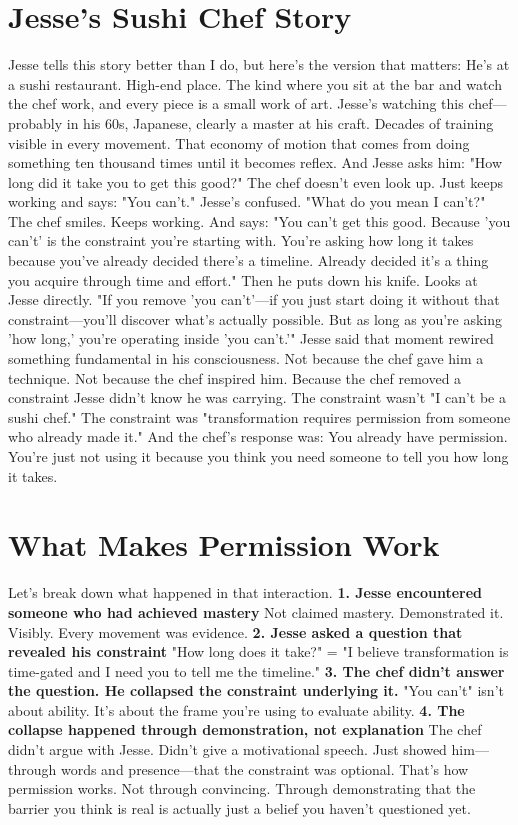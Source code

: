 \documentclass[12pt,openany]{book}
\begin{document}
\section{Jesse's Sushi Chef Story}

Jesse tells this story better than I do, but here's the version that matters:
He's at a sushi restaurant. High-end place. The kind where you sit at the bar and watch the chef work, and every piece is a small work of art.
Jesse's watching this chef—probably in his 60s, Japanese, clearly a master at his craft. Decades of training visible in every movement. That economy of motion that comes from doing something ten thousand times until it becomes reflex.
And Jesse asks him: "How long did it take you to get this good?"
The chef doesn't even look up. Just keeps working and says:
"You can't."
Jesse's confused. "What do you mean I can't?"
The chef smiles. Keeps working. And says:
"You can't get this good. Because 'you can't' is the constraint you're starting with. You're asking how long it takes because you've already decided there's a timeline. Already decided it's a thing you acquire through time and effort."
Then he puts down his knife. Looks at Jesse directly.
"If you remove 'you can't'—if you just start doing it without that constraint—you'll discover what's actually possible. But as long as you're asking 'how long,' you're operating inside 'you can't.'"
Jesse said that moment rewired something fundamental in his consciousness.
Not because the chef gave him a technique. Not because the chef inspired him.
Because the chef removed a constraint Jesse didn't know he was carrying.
The constraint wasn't "I can't be a sushi chef." The constraint was "transformation requires permission from someone who already made it."
And the chef's response was: You already have permission. You're just not using it because you think you need someone to tell you how long it takes.

\section{What Makes Permission Work}

Let's break down what happened in that interaction.
\textbf{1. Jesse encountered someone who had achieved mastery}
Not claimed mastery. Demonstrated it. Visibly. Every movement was evidence.
\textbf{2. Jesse asked a question that revealed his constraint}
"How long does it take?" = "I believe transformation is time-gated and I need you to tell me the timeline."
\textbf{3. The chef didn't answer the question. He collapsed the constraint underlying it.}
"You can't" isn't about ability. It's about the frame you're using to evaluate ability.
\textbf{4. The collapse happened through demonstration, not explanation}
The chef didn't argue with Jesse. Didn't give a motivational speech. Just showed him—through words and presence—that the constraint was optional.
That's how permission works.
Not through convincing. Through demonstrating that the barrier you think is real is actually just a belief you haven't questioned yet.
\end{document}
